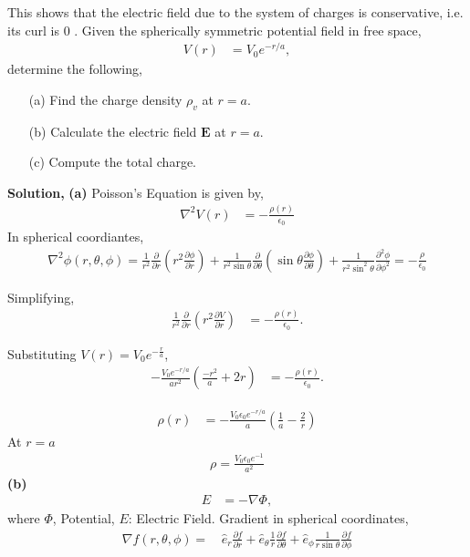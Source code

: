 \documentclass{article}
\begin{document}
This shows that the electric field due to the system of charges is conservative, i.e. its curl is $0$ \newline {}. Given the spherically symmetric potential field in free space, 
\begin{align*}
V(r) &= V_0 e^{-r/a},
\end{align*}
determine the following,

\begin{enumerate}
    \item[(a)] Find the charge density $\rho_v$ at $r = a$.
    \item[(b)] Calculate the electric field $\mathbf{E}$ at $r = a$.
    \item[(c)] Compute the total charge.
\end{enumerate}
\textbf{Solution,}\newline
\textbf{(a)} Poisson's Equation is given by,
\begin{align*}
\nabla^2 V(r) &= -\frac{\rho(r)}{\epsilon_0}
\end{align*}
In spherical coordiantes,
\begin{align*}
\nabla^2 \phi(r, \theta, \phi) = \frac{1}{r^2} \frac{\partial}{\partial r} \left( r^2 \frac{\partial \phi}{\partial r} \right) + \frac{1}{r^2 \sin \theta} \frac{\partial}{\partial \theta} \left( \sin \theta \frac{\partial \phi}{\partial \theta} \right) + \frac{1}{r^2 \sin^2 \theta} \frac{\partial^2 \phi}{\partial \phi^2} = -\frac{\rho}{\epsilon_0}
\end{align*}

Simplifying,
\begin{align*}
\frac{1}{r^2} \frac{\partial}{\partial r} \left( r^2 \frac{\partial V}{\partial r} \right) 
&= -\frac{\rho(r)}{\epsilon_0}.
\end{align*}

Substituting $V(r) = V_0 e^{-\frac{r}{a}} $,
\begin{align*}
-\frac{V_0 e^{-r/a}}{ar^2} \left( \frac{-r^2}{a} + 2r \right) &= -\frac{\rho(r)}{\epsilon_0}.
\end{align*}

\begin{align*}
\rho(r) &= -\frac{V_0 \epsilon_0 e^{-r/a}}{a}\left( \frac{1}{a} - \frac{2}{r} \right)
\end{align*}
At $ r = a $
\begin{align*}
  \rho = \frac{V_0 \epsilon_0e^{-1}}{a^2}
\end{align*}
\textbf{(b)}
\begin{align*}
E &= -\nabla \Phi,
\end{align*}
where $ \Phi $, Potential, $ E $: Electric Field. \newline
Gradient in spherical coordinates,
\begin{align*}
\nabla f(r, \theta, \phi) = & \, \hat{e}_r \frac{\partial f}{\partial r}
                            + \hat{e}_\theta \frac{1}{r} \frac{\partial f}{\partial \theta} 
                            + \hat{e}_\phi \frac{1}{r \sin \theta} \frac{\partial f}{\partial \phi}
\end{align*}
\end{document}
